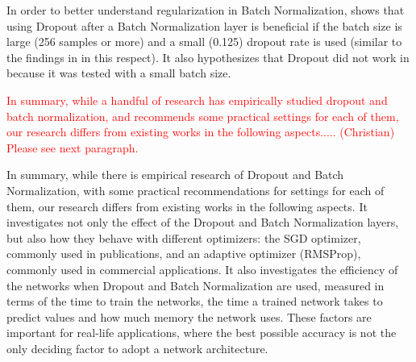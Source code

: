 \documentclass[../dropout-vs-batch-normalization.tex]{subfiles}
\begin{document}
In order to better understand regularization in Batch Normalization, \cite{Luo2018} shows that using Dropout after a Batch Normalization layer is beneficial if the batch size is large (256 samples or more) and a small (0.125) dropout rate is used (similar to the findings in \cite{Li2018} in this respect). It also hypothesizes that Dropout did not work in \cite{Ioffe2015} because it was tested with a small batch size.

\textcolor{red}{In summary, while a handful of research has empirically studied dropout and batch normalization, and recommends some practical settings for each of them, our research differs from existing works in the following aspects..... (Christian) Please see next paragraph.}

In summary, while there is empirical research of Dropout and Batch Normalization, with some practical recommendations for settings for each of them, our research differs from existing works in the following aspects. It investigates not only the effect of the Dropout and Batch Normalization layers, but also how they behave with different optimizers: the SGD optimizer, commonly used in publications, and an adaptive optimizer (RMSProp), commonly used in commercial applications. It also investigates the efficiency of the networks when Dropout and Batch Normalization are used, measured in terms of the time to train the networks, the time a trained network takes to predict values and how much memory the network uses. These factors are important for real-life applications, where the best possible accuracy is not the only deciding factor to adopt a network architecture.
\end{document}

